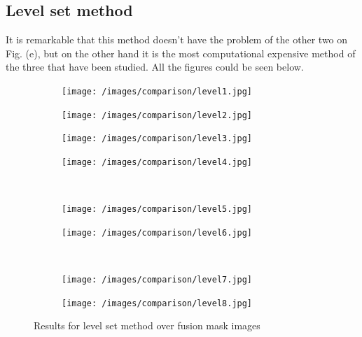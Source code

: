 \documentclass[a4paper, 10pt, conference]{ieeeconf}        %
\begin{document}
\subsection{Level set method}
It is remarkable that this method doesn't have the problem of the other two on Fig. (e), but on the other hand it is the most computational expensive method of the three that have been studied. All the figures could be seen below.
\begin{figure}[ht!]
  \centering
  \begin{subfigure}{0.45\linewidth}
  \texttt{[image: /images/comparison/level1.jpg]}
  \caption{}
  \end{subfigure}
   \begin{subfigure}{0.45\linewidth}
   \texttt{[image: /images/comparison/level2.jpg]}
   \caption{}
   \end{subfigure}
     \begin{subfigure}{0.45\linewidth}
     \texttt{[image: /images/comparison/level3.jpg]}
     \caption{}
     \end{subfigure}
       \begin{subfigure}{0.45\linewidth}
       \texttt{[image: /images/comparison/level4.jpg]}
       \caption{}
       \end{subfigure}\\
        \begin{subfigure}{0.45\linewidth}
        \texttt{[image: /images/comparison/level5.jpg]}
        \caption{}
        \end{subfigure}
          \begin{subfigure}{0.45\linewidth}
          \texttt{[image: /images/comparison/level6.jpg]}
          \caption{}
          \end{subfigure}\\
            \begin{subfigure}{0.45\linewidth}
            \texttt{[image: /images/comparison/level7.jpg]}
            \caption{}
            \end{subfigure}
             \begin{subfigure}{0.45\linewidth}
             \texttt{[image: /images/comparison/level8.jpg]}
             \caption{}
             \end{subfigure}
  \caption{Results for level set method over fusion mask images}
  \label{levelResults}
  \end{figure}
\clearpage
\end{document}
